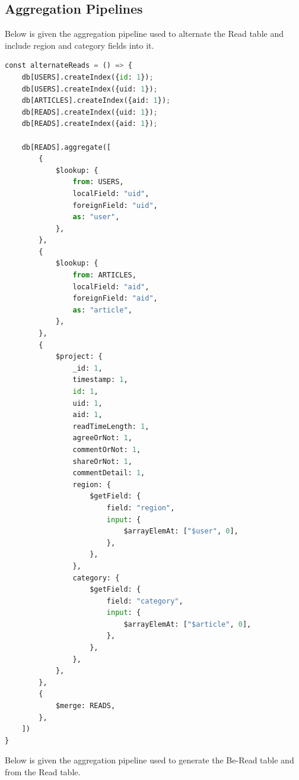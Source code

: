 \documentclass{report}
\begin{document}
    \subsection{Aggregation Pipelines}\label{subsec:appendix-aggregation}
    Below is given the aggregation pipeline used to alternate the Read table and include region and category fields into it.
\begin{lstlisting}[language=python, caption=Aggregation pipeline for alternating Read table]
const alternateReads = () => {
    db[USERS].createIndex({id: 1});
    db[USERS].createIndex({uid: 1});
    db[ARTICLES].createIndex({aid: 1});
    db[READS].createIndex({uid: 1});
    db[READS].createIndex({aid: 1});

    db[READS].aggregate([
        {
            $lookup: {
                from: USERS,
                localField: "uid",
                foreignField: "uid",
                as: "user",
            },
        },
        {
            $lookup: {
                from: ARTICLES,
                localField: "aid",
                foreignField: "aid",
                as: "article",
            },
        },
        {
            $project: {
                _id: 1,
                timestamp: 1,
                id: 1,
                uid: 1,
                aid: 1,
                readTimeLength: 1,
                agreeOrNot: 1,
                commentOrNot: 1,
                shareOrNot: 1,
                commentDetail: 1,
                region: {
                    $getField: {
                        field: "region",
                        input: {
                            $arrayElemAt: ["$user", 0],
                        },
                    },
                },
                category: {
                    $getField: {
                        field: "category",
                        input: {
                            $arrayElemAt: ["$article", 0],
                        },
                    },
                },
            },
        },
        {
            $merge: READS,
        },
    ])
}
\end{lstlisting}
     Below is given the aggregation pipeline used to generate the Be-Read table and from the Read table.
\end{document}
